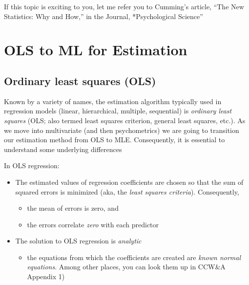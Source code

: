 \documentclass[
  11pt,
]{book}
\providecommand{\tightlist}{%
  \setlength{\itemsep}{0pt}\setlength{\parskip}{0pt}}
\begin{document}
If this topic is exciting to you, let me refer you to Cumming's \citep{cumming_new_2014} article, ``The New Statistics: Why and How,'' in the Journal, *Psychological Science''

\hypertarget{ols-to-ml-for-estimation}{%
\section{OLS to ML for Estimation}\label{ols-to-ml-for-estimation}}

\hypertarget{ordinary-least-squares-ols}{%
\subsection{Ordinary least squares (OLS)}\label{ordinary-least-squares-ols}}

Known by a variety of names, the estimation algorithm typically used in regression models (linear, hierarchical, multiple, sequential) is \emph{ordinary least squares} (OLS; also termed least squares criterion, general least squares, etc.). As we move into multivariate (and then psychometrics) we are going to transition our estimation method from OLS to MLE. Consequently, it is essential to understand some underlying differences \citep{cohen_applied_2003, myung_tutorial_2003}

In OLS regression:

\begin{itemize}
\tightlist
\item
  The estimated values of regression coefficients are chosen so that the sum of squared errors is minimized (aka, the \emph{least squares criteria}). Consequently,

  \begin{itemize}
  \tightlist
  \item
    the mean of errors is zero, and
  \item
    the errors correlate \emph{zero} with each predictor
  \end{itemize}
\item
  The solution to OLS regression is \emph{analytic}

  \begin{itemize}
  \tightlist
  \item
    the equations from which the coefficients are created are \emph{known normal equations}. Among other places, you can look them up in CCW\&A \citep{cohen_introduction_1934} Appendix 1)
  \end{itemize}
\end{itemize}
\end{document}
